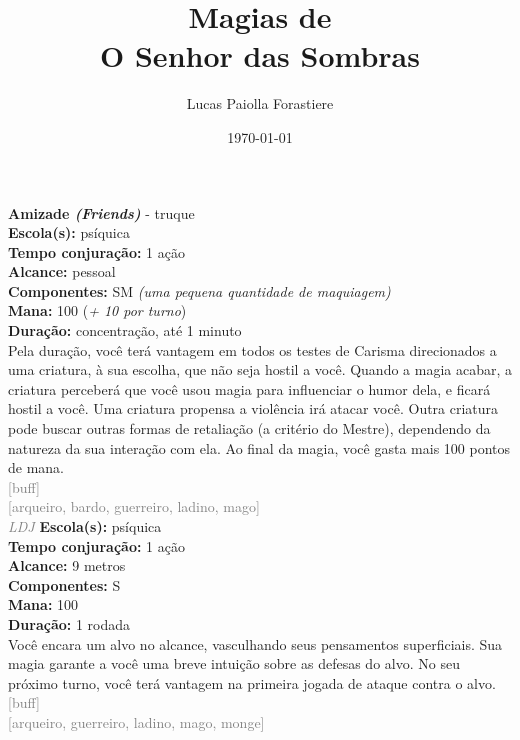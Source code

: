 \documentclass{RPG_Adventure}[2021/10/20]
\title{Magias de\\ \Huge{O Senhor das Sombras}}
\date{\today}
\author{Lucas Paiolla Forastiere}
\begin{document}
\maketitle

{\normalsize \textbf{Amizade \textit{(Friends)}} - truque\\}
{\small \t \textbf{Escola(s):} psíquica\\\t \textbf{Tempo conjuração:} 1 ação\\\t \textbf{Alcance:} pessoal\\\t \textbf{Componentes:} SM \textit{(uma pequena quantidade de maquiagem)}\\\t \textbf{Mana:} 100 (\textit{+ 10 por turno})\\\t \textbf{Duração:} concentração, até 1 minuto\\}
{\normalsize Pela duração, você terá vantagem em todos os testes de Carisma direcionados a uma criatura, à sua escolha, que não seja hostil a você. Quando a magia acabar, a criatura perceberá que você usou magia para influenciar o humor dela, e ficará hostil a você. Uma criatura propensa a violência irá atacar você. Outra criatura pode buscar outras formas de retaliação (a critério do Mestre), dependendo da natureza da sua interação com ela. Ao final da magia, você gasta mais 100 pontos de mana.\\}
{\scriptsize \textcolor{gray}{[buff]\\}}
{\scriptsize \textcolor{gray}{[arqueiro, bardo, guerreiro, ladino, mago]\\}}
{\tiny \textcolor{gray}{\textit{LDJ}}}
{\small \t \textbf{Escola(s):} psíquica\\\t \textbf{Tempo conjuração:} 1 ação\\\t \textbf{Alcance:} 9 metros\\\t \textbf{Componentes:} S\\\t \textbf{Mana:} 100\\\t \textbf{Duração:} 1 rodada\\}
{\normalsize Você encara um alvo no alcance, vasculhando seus pensamentos superficiais. Sua magia garante a você uma breve intuição sobre as defesas do alvo. No seu próximo turno, você terá vantagem na primeira jogada de ataque contra o alvo.\\}
{\scriptsize \textcolor{gray}{[buff]\\}}
{\scriptsize \textcolor{gray}{[arqueiro, guerreiro, ladino, mago, monge]\\}}
\end{document}
